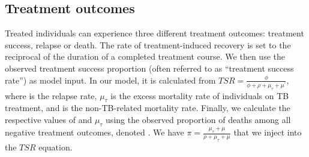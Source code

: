 \subsection{Treatment outcomes}
Treated individuals can experience three different treatment outcomes: treatment success, relapse or 
death. The rate of treatment-induced recovery \phi{} is set to the reciprocal of the duration of a 
completed treatment course. We then use the observed treatment success proportion (often referred to 
as “treatment success rate”) as model input. In our model, it is calculated from \(TSR = \frac{\phi}{\phi + \rho + \mu_{\tau} + \mu^{'}}\){}, 
where \rho{} is the relapse rate, \({\mu_{\tau}{}}\) is the excess mortality rate of individuals on TB treatment, and \mu is the 
non-TB-related mortality rate. Finally, we calculate the respective values of {\rho}{} and \({\mu_{\tau}{}}\) using the 
observed proportion of deaths among all negative treatment outcomes, denoted \pi{}. We have \({\pi = \frac{\mu_{\tau} +\mu}{\rho + \mu_{\tau} + \mu}}\){} that we inject into the \({TSR}\) equation.

